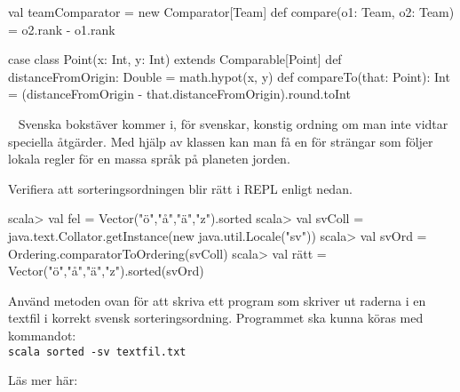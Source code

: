 \SOLUTION


\TaskSolved \what


\SubtaskSolved

\SubtaskSolved  %
\begin{Code}
val teamComparator = new Comparator[Team]{
  def compare(o1: Team, o2: Team) = o2.rank - o1.rank
}
\end{Code}


\SubtaskSolved

\SubtaskSolved

\SubtaskSolved

\begin{Code}
case class Point(x: Int, y: Int) extends Comparable[Point] {
  def distanceFromOrigin: Double = math.hypot(x, y)
  def compareTo(that: Point): Int =
    (distanceFromOrigin - that.distanceFromOrigin).round.toInt
}
\end{Code}


\QUESTEND







\QUESTBEGIN

\Task \label{task:swedish-letter-ordering} \what~   Svenska bokstäver kommer i, för svenskar, konstig ordning om man inte vidtar speciella åtgärder. Med hjälp av klassen  kan man få en  för strängar som följer lokala regler för en massa språk på planeten jorden.

\Subtask Verifiera att sorteringsordningen blir rätt i REPL enligt nedan.

\begin{REPL}
scala> val fel = Vector("ö","å","ä","z").sorted
scala> val svColl = java.text.Collator.getInstance(new java.util.Locale("sv"))
scala> val svOrd = Ordering.comparatorToOrdering(svColl)
scala> val rätt = Vector("ö","å","ä","z").sorted(svOrd)
\end{REPL}
\Subtask Använd metoden ovan för att skriva ett program som skriver ut raderna i en textfil i korrekt svensk sorteringsordning. Programmet ska kunna köras med kommandot:\\\texttt{scala sorted -sv textfil.txt}

\Subtask Läs mer här: \\



